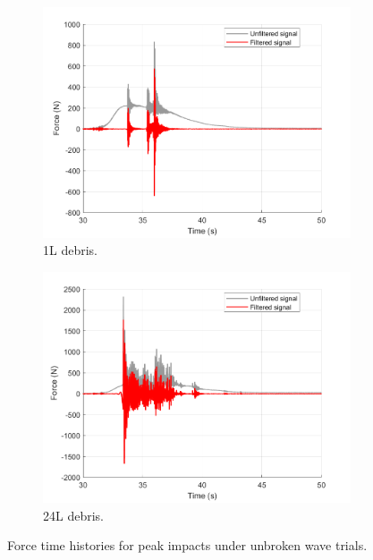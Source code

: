 \documentclass{article}
\begin{document}
\begin{figure}[h!]
    \centering
    \begin{subfigure}{0.48\textwidth}
        \includegraphics[width=\linewidth]{Reg_Lift_U_1_L_D__Masters_NHERIDeprisImpact2_goodtests_Reg_Lift_U_1_L_Trial04_Peak.png}
        \caption{1L debris.}
    \end{subfigure}
    \hfill
    \begin{subfigure}{0.48\textwidth}
        \includegraphics[width=\linewidth]{Reg_Lift_U_24_L_D__Masters_NHERIDeprisImpact2_goodtests_Reg_Lift_U_24_L_Trial04_Peak.png}
        \caption{24L debris.}
    \end{subfigure}
    \caption{Force time histories for peak impacts under unbroken wave trials.}
    \label{fig:timehist_unbroken_peaks}
\end{figure}
\end{document}
